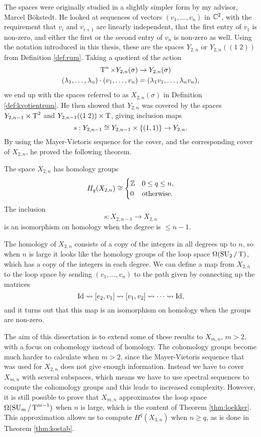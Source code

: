 The spaces
were originally studied in a slightly simpler form by my advisor,
Marcel B\"okstedt. He looked at sequences of vectors $(v_1,\dots,v_n)$
in $\mathbb{C}^2$, with the requirement that $v_i$ and $v_{i+1}$ are linearly
independent, that the first entry of $v_1$  is non-zero, and either
the first or the second entry of $v_n$ is non-zero as well. Using the
notation introduced in this thesis, these are the spaces $Y_{2,n}$ or
$Y_{2,n}((1\;2))$ from Definition \ref{def:rum}. Taking a quotient
of the action
\begin{align*}
  \operatorname{T}^n \times Y_{2,n}(\sigma) &\to Y_{2,n}(\sigma) \\
  (\lambda_1,\dots,\lambda_n)\cdot (v_1,\dots,v_n) &= (\lambda_1v_1,\dots,\lambda_nv_n),
\end{align*}
we end up with the spaces referred to as $X_{2,n}(\sigma)$ in
Definition \ref{def:kvotientrum}. He then showed that $Y_{2,n}$ was
covered by the spaces $Y_{2,n-1}\times\operatorname{T}^2$ and $Y_{2,n-1}((1\; 2))\times
\operatorname{T}$, giving inclusion maps
\[ s : Y_{2,n-1} \cong Y_{2,n-1}\times\left\{ (1,1) \right\} \to Y_{2,n}. \]
By using the Mayer-Vietoris sequence for the cover, and the
corresponding cover of $X_{2,n}$, he proved the
following theorem.
\begin{theorem}
  The space $X_{2,n}$ has homology groups
  \[ H_q(X_{2,n}) \cong
  \begin{cases}
    \mathbb{Z} & 0 \leq q \leq n, \\
    0 & \text{otherwise.}
  \end{cases} \]
  The inclusion
  \[ s : X_{2,n-1} \to X_{2,n} \]
  is an isomorphism on homology when the degree is $\leq n-1$.
\end{theorem}

The homology of $X_{2,n}$ consists of a copy of the integers in all
degrees up to $n$, so when $n$ is large it looks like the homology
groups of the loop space
$\Omega(\operatorname{SU}_2/\operatorname{T})$, which has a copy of the integers in each
degree. We can define a map from $X_{2,n}$ to the loop space
by sending $(v_1,\dots,v_n)$ to
the path given by connecting up the matrices
\[ \operatorname{Id} \leadsto [e_2,v_1] \leadsto [v_1,v_2] \leadsto \dots \leadsto
\operatorname{Id}, \]
and it turns out that this map is an isomorphism on homology when the
groups are non-zero.

The aim of this dissertation is to extend some of
these results to $X_{m,n}$, $m > 2$, with a focus on cohomology
instead of homology. The cohomology groups become much harder to
calculate when $m > 2$, since the Mayer-Vietoris sequence that was
used for $X_{2,n}$
does not give enough information. Instead we have to cover $X_{m,n}$
with several subspaces, which means we have to use spectral
sequences to compute the cohomology groups and this leads to increased
complexity. However, it is still possible to prove that $X_{m,n}$
approximates the loop space $\Omega(\operatorname{SU}_{m}/\operatorname{T}^{m-1})$ when $n$ is large, which
is the content of Theorem \ref{thm:loekker}. This approximation allows
us to compute $H^q(X_{3,n})$ when $n \geq q$, as is done in Theorem
\ref{thm:kostab}.

